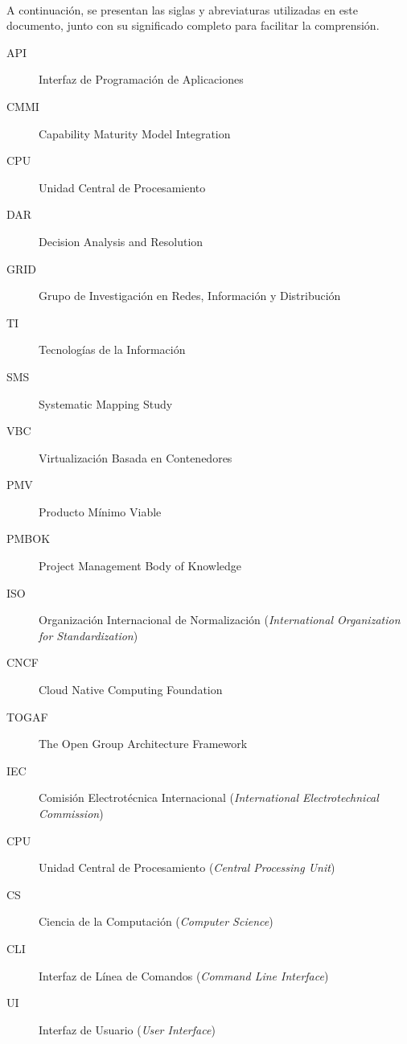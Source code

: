 \label{cap:siglas}
\mbox{}\\
A continuación, se presentan las siglas y abreviaturas utilizadas en este documento, junto con su significado completo para facilitar la comprensión.
\begin{description}
  \item[API] Interfaz de Programación de Aplicaciones
  \item[CMMI] Capability Maturity Model Integration
  \item[CPU] Unidad Central de Procesamiento
  \item[DAR] Decision Analysis and Resolution
  \item[GRID] Grupo de Investigación en Redes, Información y Distribución
  \item[TI] Tecnologías de la Información
  \item[SMS] Systematic Mapping Study
  \item[VBC] Virtualización Basada en Contenedores
  \item[PMV] Producto Mínimo Viable
  \item[PMBOK] Project Management Body of Knowledge
  \item[ISO] Organización Internacional de Normalización (\textit{International Organization for Standardization})
  \item[CNCF] Cloud Native Computing Foundation
  \item[TOGAF] The Open Group Architecture Framework
  \item[IEC] Comisión Electrotécnica Internacional (\textit{International Electrotechnical Commission})
  \item[CPU] Unidad Central de Procesamiento (\textit{Central Processing Unit})
  \item[CS] Ciencia de la Computación (\textit{Computer Science})
  \item[CLI] Interfaz de Línea de Comandos (\textit{Command Line Interface})
  \item[UI] Interfaz de Usuario (\textit{User Interface})
\end{description}
